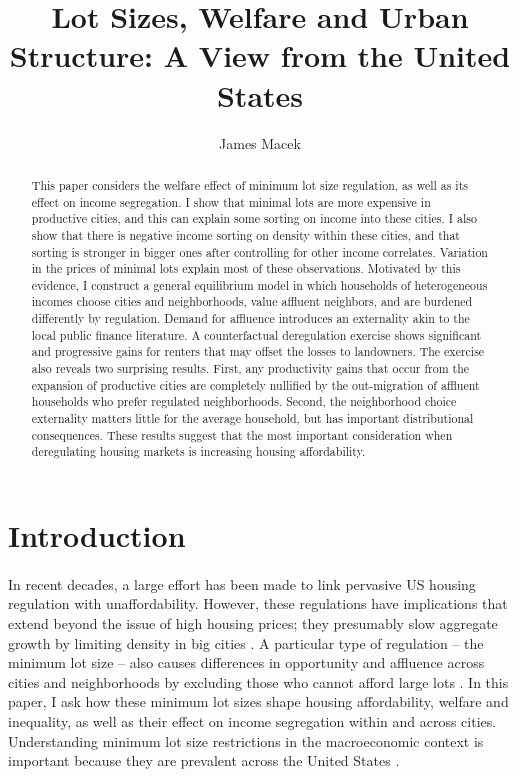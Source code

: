 \documentclass[11pt]{article}
\title{Lot Sizes, Welfare and Urban Structure: A View from the United States}
\author{James Macek}
\begin{document}
\maketitle	
		
\begin{abstract}
	\scriptsize
This paper considers the welfare effect of minimum lot size regulation, as well as its effect on income segregation. I show that minimal lots are more expensive in productive cities, and this can explain some sorting on income into these cities. I also show that there is negative income sorting on density within these cities, and that sorting is stronger in bigger ones after controlling for other income correlates. Variation in the prices of minimal lots explain most of these observations. Motivated by this evidence, I construct a general equilibrium model in which households of heterogeneous incomes choose cities and neighborhoods, value affluent neighbors, and are burdened differently by regulation. Demand for affluence introduces an externality akin to the local public finance literature. A counterfactual deregulation exercise shows significant and progressive gains for renters that may offset the losses to landowners. The exercise also reveals two surprising results. First, any productivity gains that occur from the expansion of productive cities are completely nullified by the out-migration of affluent households who prefer regulated neighborhoods. Second, the neighborhood choice externality matters little for the average household, but has important distributional consequences. These results suggest that the most important consideration when deregulating housing markets is increasing housing affordability. 


\end{abstract}	

	
	\newpage	
	\section{Introduction}
		
	\paragraph*{}
	
	In recent decades, a large effort has been made to link pervasive US housing regulation with unaffordability. However, these regulations have implications that extend beyond the issue of high housing prices; they presumably slow aggregate growth by limiting density in big cities \citep{hseihmoretti,durantonpugaurbgrowth}. A particular type of regulation -- the minimum lot size -- also causes differences in opportunity and affluence across cities and neighborhoods by excluding those who cannot afford large lots \citep{Song, kulka}. In this paper, I ask how these minimum lot sizes shape housing affordability, welfare and inequality, as well as their effect on income segregation within and across cities. Understanding minimum lot size restrictions in the macroeconomic context is important because they are prevalent across the United States \citep{gyourko2021}. 
	
\end{document}
